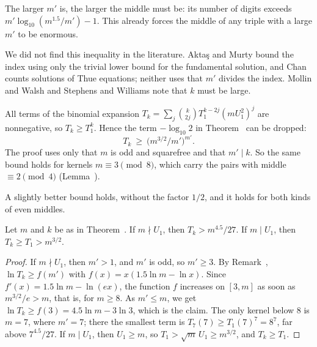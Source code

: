 \inwords The larger $m'$ is, the larger the middle must be: its number of digits exceeds $m' \log_{10}(m^{1.5}/m') - 1$. This already
forces the middle of any triple with a large $m'$ to be enormous.

We did not find this inequality in the literature. Aktaş and Murty \cite[proof of Theorem~1.3, p.~251]{AktasMurty2017} bound the index
using only the trivial lower bound for the fundamental solution, and Chan \cite[Section~2]{Chan2012} counts solutions of Thue equations; neither uses
that $m'$ divides the index. Mollin and Walsh \cite[p.~111]{MollinWalsh1986a} and Stephens and Williams \cite[p.~619]{StephensWilliams1988}
note that $k$ must be large.

\begin{remark}
All terms of the binomial expansion $T_k = \sum_j \binom{k}{2j} T_1^{k-2j} (m U_1^2)^j$ are nonnegative, so $T_k \ge T_1^k$. Hence the term
$-\log_{10} 2$ in Theorem~ can be dropped:
\[
  T_k \ \ge\ \bigl(m^{3/2}/m'\bigr)^{m'} .
\]
The proof uses only that $m$ is odd and squarefree and that $m' \mid k$. So the same bound holds for kernels $m \equiv 3 \pmod 8$, which
carry the pairs with middle $\equiv 2 \pmod 4$ (Lemma~).
\end{remark}

\inwords A slightly better bound holds, without the factor $1/2$, and it holds for both kinds of even middles.

\begin{corollary}
Let $m$ and $k$ be as in Theorem~. If $m \nmid U_1$, then $T_k > m^{4.5}/27$. If $m \mid U_1$, then $T_k \ge T_1 > m^{3/2}$.
\end{corollary}

\begin{proof}
If $m \nmid U_1$, then $m' > 1$, and $m'$ is odd, so $m' \ge 3$. By Remark~,
$\ln T_k \ge f(m')$ with $f(x) = x (1.5 \ln m - \ln x)$. Since $f'(x) = 1.5 \ln m - \ln(e x)$, the function $f$ increases on $[3, m]$ as
soon as $m^{3/2}/e > m$, that is, for $m \ge 8$. As $m' \le m$, we get $\ln T_k \ge f(3) = 4.5 \ln m - 3 \ln 3$, which is the claim. The only
kernel below $8$ is $m = 7$, where $m' = 7$; there the smallest term is $T_7(7) \ge T_1(7)^7 = 8^7$, far above $7^{4.5}/27$.
If $m \mid U_1$, then $U_1 \ge m$, so $T_1 > \sqrt{m}\, U_1 \ge m^{3/2}$, and $T_k \ge T_1$.
\end{proof}

